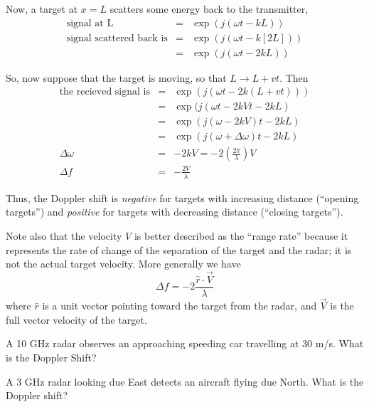 Now, a target at $x=L$ scatters some energy back to the transmitter,
\begin{eqnarray}
\textrm{signal at L} &=& \exp(j(\omega t - kL)) \\
\textrm{signal scattered back is} &=& \exp(j(\omega t - k [2L])) \\
 &=& \exp(j(\omega t - 2kL)) 
\end{eqnarray}

So, now suppose that the target is moving, so that $L \rightarrow L +
vt$.  Then 
\begin{eqnarray}
\textrm{the recieved signal is} &=& \exp(j(\omega t - 2k(L + vt))) \\
&=& \exp(j(\omega t - 2kVt - 2kL) \\
&=& \exp(j(\omega - 2kV)t - 2kL) \\
&=& \exp(j(\omega + \Delta \omega) t - 2kL) \\
\Delta \omega &=& -2kV = -2\left(\frac{2\pi}{\lambda}\right) V\\
\Delta f &=& -\frac{2V}{\lambda}
\end{eqnarray}

Thus, the Doppler shift is \textit{negative} for targets with
increasing distance (``opening targets'') and \textit{positive} for
targets with decreasing distance (``closing targets'').  

Note also that the velocity $V$ is better described as the ``range rate'' because it represents
the rate of change of the separation of the target and the radar; it is not the actual target velocity.  
More generally we have
\begin{equation}
\Delta f = -2 \frac{\hat{r}\cdot \vec{V}}{\lambda}
\end{equation}
where $\hat{r}$ is a unit vector pointing toward the target from the radar, and $\vec{V}$ is the full vector velocity of the target.

\begin{example} A 10 GHz radar observes an approaching speeding car
  travelling at 30 m/s.  What is the Doppler Shift?

\end{example}

\begin{example} A 3 GHz radar looking due East detects an aircraft flying due North.  What is the Doppler shift? \\
\end{example}

